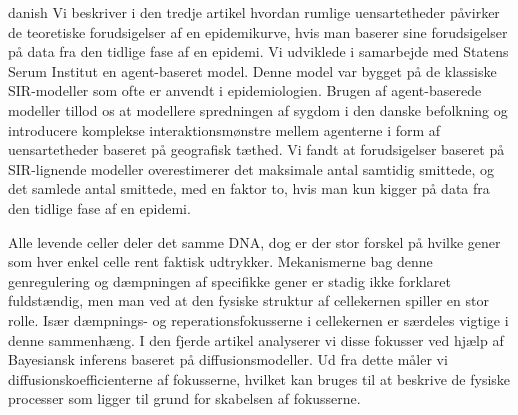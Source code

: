 \begin{otherlanguage*}{danish}
    Vi beskriver i den tredje artikel hvordan rumlige uensartetheder påvirker de teoretiske forudsigelser af en epidemikurve, hvis man baserer sine forudsigelser på data fra den tidlige fase af en epidemi. Vi udviklede i samarbejde med Statens Serum Institut en agent-baseret model. Denne model var bygget på de klassiske SIR-modeller som ofte er anvendt i epidemiologien. Brugen af agent-baserede modeller tillod os at modellere spredningen af sygdom i den danske befolkning og introducere komplekse interaktionsmønstre mellem agenterne i form af uensartetheder baseret på geografisk tæthed. Vi fandt at forudsigelser baseret på SIR-lignende modeller overestimerer det maksimale antal samtidig smittede, og det samlede antal smittede, med en faktor to, hvis man kun kigger på data fra den tidlige fase af en epidemi.

    Alle levende celler deler det samme DNA, dog er der stor forskel på hvilke gener som hver enkel celle rent faktisk udtrykker. Mekanismerne bag denne genregulering og dæmpningen af specifikke gener er stadig ikke forklaret fuldstændig, men man ved at den fysiske struktur af cellekernen spiller en stor rolle. Især dæmpnings- og reperationsfokusserne i cellekernen er særdeles vigtige i denne sammenhæng.  I den fjerde artikel analyserer vi disse fokusser ved hjælp af Bayesiansk inferens baseret på diffusionsmodeller. Ud fra dette måler vi diffusionskoefficienterne af fokusserne, hvilket kan bruges til at beskrive de fysiske processer som ligger til grund for skabelsen af fokusserne.


\end{otherlanguage*}